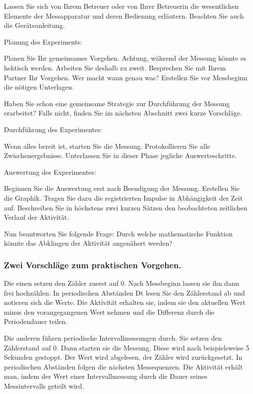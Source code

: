 \documentclass[12pt,a4paper,twoside]{article}
\begin{document}
Lassen Sie sich von Ihrem Betreuer oder von Ihrer Betreuerin die wesentlichen Elemente der Messapparatur und deren Bedienung erläutern. Beachten Sie auch die Geräteanleitung.

Planung des Experiments:

Planen Sie Ihr gemeinsames Vorgehen. Achtung, während der Messung könnte es hektisch werden. Arbeiten Sie deshalb zu zweit. Besprechen Sie mit Ihrem Partner Ihr Vorgehen. Wer macht wann genau was? Erstellen Sie vor Messbeginn die nötigen Unterlagen.

Haben Sie schon eine gemeinsame Strategie zur Durchführung der Messung erarbeitet? Falls nicht, finden Sie im nächsten Abschnitt zwei kurze Vorschläge.

Durchführung des Experimentes:

Wenn alles bereit ist, starten Sie die Messung. Protokollieren Sie alle Zwischenergebnisse. Unterlassen Sie in dieser Phase jegliche Auswerteschritte.

Auswertung des Experimentes:

Beginnen Sie die Auswertung erst nach Beendigung der Messung. Erstellen Sie die Graphik. Tragen Sie dazu die registrierten Impulse in Abhängigkeit der Zeit auf. Beschreiben Sie in höchstens zwei kurzen Sätzen den beobachteten zeitlichen Verlauf der Aktivität.

Nun beantworten Sie folgende Frage: Durch welche mathematische Funktion könnte das Abklingen der Aktivität angenähert werden?

\subsubsection*{Zwei Vorschläge zum praktischen Vorgehen.}
Die einen setzen den Zähler zuerst auf 0. Nach Messbeginn lassen sie ihn dann frei hochzählen. In periodischen Abständen Dt lesen Sie den Zählerstand ab und notieren sich die Werte. Die Aktivität erhalten sie, indem sie den aktuellen Wert minus den vorangegangenen Wert nehmen und die Differenz durch die Periodendauer teilen.

Die anderen führen periodische Intervallmessungen durch. Sie setzen den Zählerstand auf 0. Dann starten sie die Messung. Diese wird nach beispielsweise 5 Sekunden gestoppt. Der Wert wird abgelesen, der Zähler wird zurückgesetzt. In periodischen Abständen folgen die nächsten Messequenzen. Die Aktivität erhält man, indem der Wert einer Intervallmessung durch die Dauer seines Messintervalls geteilt wird.
\end{document}
